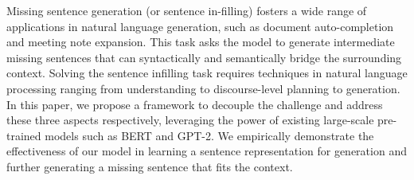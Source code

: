 Missing sentence generation (or sentence in-filling) fosters a wide range of applications in natural language generation, such as document auto-completion and meeting note expansion. This task asks the model to generate intermediate missing sentences that can syntactically and semantically bridge the surrounding context. Solving the sentence infilling task requires techniques in natural language processing ranging from understanding to discourse-level planning to generation. In this paper, we propose a framework to decouple the challenge and address these three aspects respectively, leveraging the power of existing large-scale pre-trained models such as BERT and GPT-2. We empirically demonstrate the effectiveness of our model in learning a sentence representation for generation and further generating a missing sentence that fits the context.
